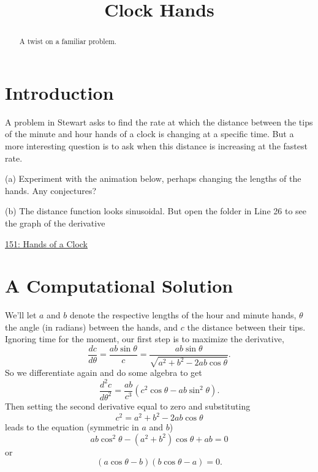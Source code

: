 \documentclass{ximera}
\title{Clock Hands}
\begin{document}
\begin{abstract}
A twist on a familiar problem.
\end{abstract}
\maketitle

\section*{Introduction}
A problem in Stewart asks to find the rate at which the distance between the tips of the minute and hour hands of a clock is changing at a specific time. But a more interesting question is to ask when this distance is increasing at the fastest rate. 


\begin{exploration}
(a) Experiment with the animation below, perhaps changing the lengths of the hands. Any conjectures?

(b) The distance function looks sinusoidal. But open the folder in Line 26 to see the graph of the derivative 

\begin{onlineOnly}
    \begin{center}
\end{center}
\end{onlineOnly}

\href{https://www.desmos.com/calculator/zz3qff7ocv}{151: Hands of a Clock}


\end{exploration}

\section*{A Computational Solution}

We'll let $a$ and $b$ denote the respective lengths of the hour and minute hands, $\theta$ the angle (in radians) between the hands, and $c$ the distance between their tips. Ignoring time for the moment, our first step is to maximize the derivative,
\[
        \frac{dc}{d\theta} = \frac{ab\sin \theta}{c} = \frac{ab \sin \theta}{\sqrt{a^2+b^2-2ab\cos\theta}}.
\]
So we differentiate again and do some algebra to get
\[
       \frac{d^2c}{d\theta^2} = \frac{ab}{c^3} \left( c^2\cos\theta - ab\sin^2\theta  \right).
\]
Then setting the second derivative equal to zero and substituting 
\[
      c^2 = a^2+b^2-2ab\cos\theta
\]
leads to the equation (symmetric in $a$ and $b$)
\[
     ab \cos^2\theta - (a^2 + b^2)\cos\theta + ab = 0
\]
or
\[
              (a \cos \theta - b) (b \cos \theta - a) = 0 .
\]
\end{document}
